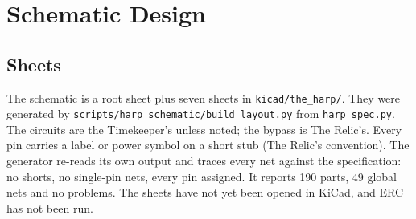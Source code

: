 \chapter{Schematic Design}\label{ch:schematic}

\section{Sheets}
The schematic is a root sheet plus seven sheets in \texttt{kicad/the\_harp/}. They were generated by \texttt{scripts/harp\_schematic/build\_layout.py} from \texttt{harp\_spec.py}. The circuits are the Timekeeper's unless noted; the bypass is The Relic's. Every pin carries a label or power symbol on a short stub (The Relic's convention). The generator re-reads its own output and traces every net against the specification: no shorts, no single-pin nets, every pin assigned. It reports 190 parts, 49 global nets and no problems. The sheets have not yet been opened in KiCad, and ERC has not been run.

